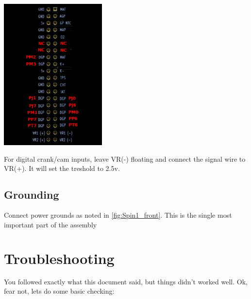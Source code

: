 \documentclass[12pt,a4paper,titlepage]{article}
\begin{document}
\begin{center}
\includegraphics[width=0.4\textwidth]{images/PumaSpin1HeaderPinOut.png}
\end{center}

For digital crank/cam inputs, leave VR(-) floating and connect the signal wire to VR(+). It will set the treshold to 2.5v.

\subsection{Grounding}

Connect power grounds as noted in \ref{fig:Spin1_front}. This is the single most important part of the assembly




\section{Troubleshooting}

You followed exactly what this document said, but things didn't worked well. Ok, fear not, lets do some basic checking:
\end{document}
